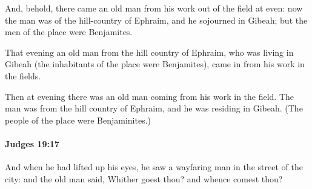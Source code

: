 			\begin{versebox}
					\item[BHS] 
					\item[ASV] And, behold, there came an old man from his work out of the field at even: now the man was of the hill-country of Ephraim, and he sojourned in Gibeah; but the men of the place were Benjamites.
					\item[NIV] That evening an old man from the hill country of Ephraim, who was living in Gibeah (the inhabitants of the place were Benjamites), came in from his work in the fields.
					\item[NRSV] Then at evening there was an old man coming from his work in the field. The man was from the hill country of Ephraim, and he was residing in Gibeah. (The people of the place were Benjaminites.)
			\end{versebox}

		\paragraph{Judges 19:17} %
			\label{JUDGES-19-17}

			And when he had lifted up his eyes, he saw a wayfaring man in the street of the city: and the old man said, Whither goest thou? and whence comest thou?

